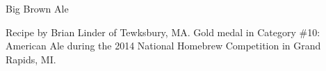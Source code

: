 \begin{recipe}{Big Brown Ale}

\begin{aboutblock}
Recipe by Brian Linder of Tewksbury, MA. Gold medal in Category \#10: American
Ale during the 2014 National Homebrew Competition in Grand Rapids, MI.
\sourceaha
\end{aboutblock}


\begin{methodandtiming}

\begin{mashsteps}
\end{mashsteps}

\begin{fermentationsteps}
\end{fermentationsteps}

\end{methodandtiming}

\recipebreak

\begin{ingredientsblock}

\begin{malts}
\end{malts}

\begin{hops}
\end{hops}


\end{ingredientsblock}

\end{recipe}

